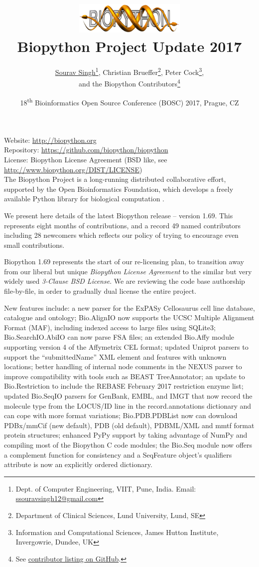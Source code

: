 \documentclass[10pt,oneside]{article}
\title{%
\vspace{-1.5in}
\includegraphics[width=0.4\textwidth]{../presentation/figures/biopython.jpg}\\
\vspace{3mm}Biopython Project Update 2017}
\author{
	\underline{Sourav Singh}\thanks{Dept. of Computer Engineering, VIIT, Pune, India. Email: \href{mailto:ssouravsingh12@gmail.com}{ssouravsingh12@gmail.com}},
    Christian Brueffer\thanks{Department of Clinical Sciences, Lund University, Lund, SE},
    Peter Cock\thanks{Information and Computational Sciences, James Hutton Institute, Invergowrie, Dundee, UK},\\
    and the Biopython Contributors\thanks{See \href{https://github.com/biopython/biopython/blob/master/CONTRIB.rst}{contributor listing on GitHub}.}}
\date{18\textsuperscript{th} Bioinformatics Open Source Conference (BOSC) 2017, Prague, CZ}
\begin{document}
\maketitle
\thispagestyle{empty}

\vspace{-0.2in}
\noindent
Website: \url{http://biopython.org} \\
Repository: \url{https://github.com/biopython/biopython} \\
License: Biopython License Agreement (BSD like, see \url{http://www.biopython.org/DIST/LICENSE}) \\

The Biopython Project is a long-running distributed collaborative effort,
supported by the Open Bioinformatics Foundation, which develops a freely
available Python library for biological computation \cite{AppNote}.

We present here details of the latest Biopython release -- version 1.69.
This represents eight months of contributions, and a record 49 named
contributors including 28 newcomers which reflects our policy of trying to
encourage even small contributions.

Biopython 1.69 represents the start of our re-licensing plan, to transition away
from our liberal but unique \emph{Biopython License Agreement} to the similar
but very widely used \emph{3-Clause BSD License}. We are reviewing the code
base authorship file-by-file, in order to gradually dual license the entire
project.

New features include: a new parser for the ExPASy Cellosaurus cell line
database, catalogue and ontology; Bio.AlignIO now supports the UCSC Multiple
Alignment Format (MAF), including indexed access to large files using SQLite3;
Bio.SearchIO.AbiIO can now parse FSA files; an extended Bio.Affy module supporting
version 4 of the Affymetrix CEL format; updated Uniprot parsers to support
the ``submittedName'' XML element and features with unknown locations; better
handling of internal node comments in the NEXUS parser to improve compatibility
with tools such as BEAST TreeAnnotator; an update to Bio.Restriction to include
the REBASE February 2017 restriction enzyme list; updated Bio.SeqIO parsers for
GenBank, EMBL, and IMGT that now record the molecule type from the LOCUS/ID line
in the record.annotations dictionary and can cope with more format variations;
Bio.PDB.PDBList now can download PDBx/mmCif (new default), PDB (old default),
PDBML/XML and mmtf format protein structures; enhanced PyPy support by taking
advantage of NumPy and compiling most of the Biopython C code modules; the Bio.Seq
module now offers a complement function for consistency and a SeqFeature object's
qualifiers attribute is now an explicitly ordered dictionary.
\end{document}
